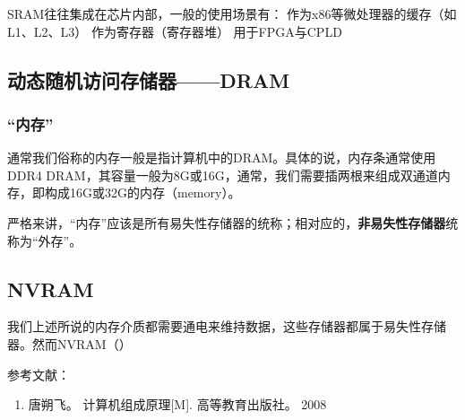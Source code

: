 SRAM往往集成在芯片内部，一般的使用场景有：
作为x86等微处理器的缓存（如L1、L2、L3）
作为寄存器（寄存器堆）
用于FPGA与CPLD

\subsection{动态随机访问存储器——DRAM}



\subsubsection{“内存”}

通常我们俗称的内存一般是指计算机中的DRAM。具体的说，内存条通常使用DDR4 DRAM，其容量一般为8G或16G，通常，我们需要插两根来组成双通道内存，即构成16G或32G的内存（memory）。

严格来讲，“内存”应该是所有易失性存储器的统称；相对应的，\textbf{非易失性存储器}统称为“外存”。





\subsection{NVRAM}

我们上述所说的内存介质都需要通电来维持数据，这些存储器都属于易失性存储器。然而NVRAM（）



参考文献：
\begin{enumerate}
\item 唐朔飞。 计算机组成原理[M]. 高等教育出版社。 2008
\end{enumerate}
